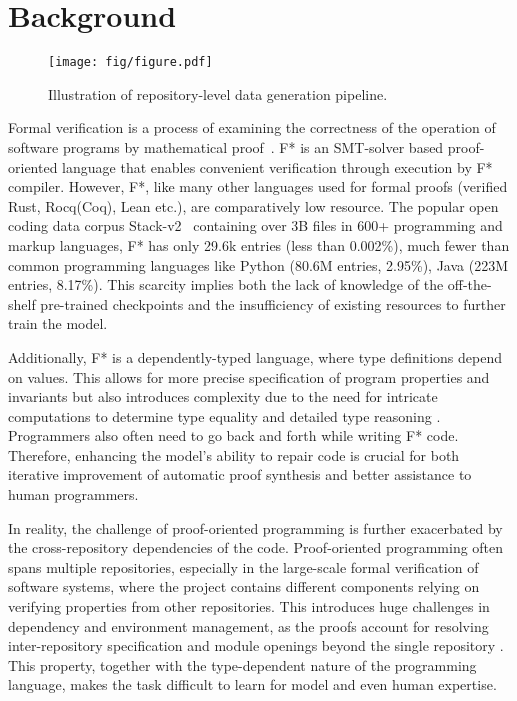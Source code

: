 \section{Background}
\begin{figure*}[h]
    \centering
    \texttt{[image: fig/figure.pdf]}
    \caption{Illustration of repository-level data generation pipeline.}
    \label{fig:pipline}
\end{figure*}
Formal verification is a process of examining the correctness of the operation of software programs by mathematical proof~\cite{digitalsystem}. F* is an SMT-solver based proof-oriented language that enables convenient verification through execution by F* compiler. However, F*, like many other languages used for formal proofs (verified Rust, Rocq(Coq), Lean etc.), are comparatively low resource.  The popular open coding data corpus Stack-v2~\cite{lozhkov2024starcoder} containing over 3B files in 600+ programming and markup languages,  F* has only 29.6k entries (less than 0.002\%), much fewer than common programming languages like Python (80.6M entries, 2.95\%), Java (223M entries, 8.17\%). This scarcity implies both the lack of knowledge of the off-the-shelf pre-trained checkpoints and the insufficiency of existing resources to further train the model. 

Additionally, F* is a dependently-typed language, where type definitions depend on values. This allows for more precise specification of program properties and invariants but also introduces complexity due to the need for intricate computations to determine type equality and detailed type reasoning \cite{chakraborty2024towards}. Programmers also often need to go back and forth while writing F* code. Therefore, enhancing the model's ability to repair code is crucial for both iterative improvement of automatic proof synthesis and better assistance to human programmers.


In reality, the challenge of proof-oriented programming is further exacerbated by the cross-repository dependencies of the code. Proof-oriented programming often spans multiple repositories, especially in the large-scale formal verification of software systems, where the project contains different components relying on verifying properties from other repositories. This introduces huge challenges in dependency and environment management, as the proofs account for resolving inter-repository specification and module openings beyond the single repository \cite{chakraborty2024towards}. This property, together with the type-dependent nature of the programming language, makes the task difficult to learn for model and even human expertise. 
